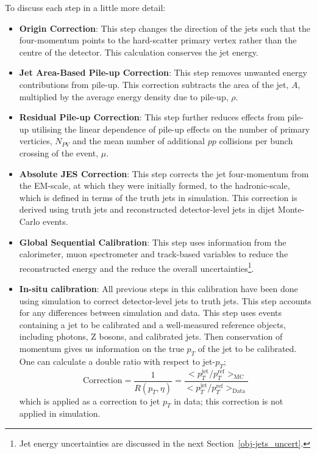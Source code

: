 \noindent
To discuss each step in a little more detail:
\begin{itemize}
\item\textbf{Origin Correction}:
  This step changes the direction of the jets such that the four-momentum points to the hard-scatter primary vertex
  rather than the centre of the detector.
  This calculation conserves the jet energy.
\item\textbf{Jet Area-Based Pile-up Correction}:
  This step removes unwanted energy contributions from pile-up.
  This correction subtracts the area of the jet, $A$, multiplied by the average energy density due to pile-up, $\rho$.
\item\textbf{Residual Pile-up Correction}:
  This step further reduces effects from pile-up utilising the linear dependence of pile-up effects on
  the number of primary verticies, $N_{PV}$
  and the mean number of additional $pp$ collisions per bunch crossing of the event, $\mu$.
\item\textbf{Absolute JES Correction}:
  This step corrects the jet four-momentum from the EM-scale, at which they were initially formed,
  to the hadronic-scale, which is defined in terms of the truth jets in simulation.
  This correction is derived using truth jets and reconstructed detector-level jets in dijet Monte-Carlo events.
\item\textbf{Global Sequential Calibration}:
  This step uses information from the calorimeter, muon spectrometer and track-based variables
  to reduce the reconstructed energy and the reduce the overall uncertainties\footnote{Jet energy uncertainties are discussed in the next Section~\ref{obj-jets_uncert}.}.
\item\textbf{In-situ calibration}:
  All previous steps in this calibration have been done using simulation to correct
  detector-level jets to truth jets. This step accounts for any differences between simulation and data.
  This step uses events containing a jet to be calibrated and a well-measured reference objects, including photons, Z bosons, and calibrated jets.
  Then conservation of momentum gives us information on the true $p_T$ of the jet to be calibrated.
  One can calculate a double ratio with respect to jet-$p_T$;
  \begin{equation}
    \text{Correction} = \frac{1}{R(p_T, \eta)} = \frac{ < p_T^{\text{jet}}/p_T^{\text{ref}}>_{\text{MC}} }{ < p_T^{\text{jet}}/p_T^{\text{ref}}>_{\text{Data}} }
  \end{equation}
  which is applied as a correction to jet $p_T$ in data; this correction is not applied in simulation.
\end{itemize}

